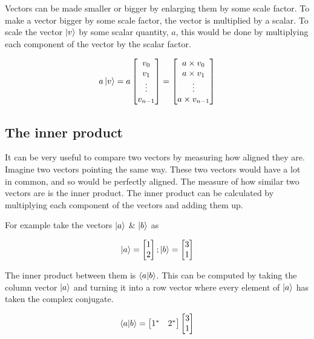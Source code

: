 Vectors can be made smaller or bigger by enlarging them by some scale factor. To make a vector bigger by some scale factor, the vector is multiplied by a scalar. To scale the vector $\ket{v}$ by some scalar quantity, $a$, this would be done by multiplying each component of the vector by the scalar factor. 

$$ a \ket{v} = a\begin{bmatrix} v_0 \\ v_1 \\ \vdots \\ v_{n-1} \end{bmatrix} = \begin{bmatrix} a \times v_0 \\ a \times v_1 \\ \vdots \\ a \times v_{n-1} \end{bmatrix} $$

\subsection{The inner product}

It can be very useful to compare two vectors by measuring how aligned they are. Imagine two vectors pointing the same way. These two vectors would have a lot in common, and so would be perfectly aligned. The measure of how similar two vectors are is the inner product. The inner product can be calculated by multiplying each component of the vectors and adding them up. 

For example take the vectors $\ket{a}$ \& $\ket{b}$ as 

 $$
 \ket{a} = \begin{bmatrix} 1 \\ 2 \end{bmatrix} ;  \ket{b} = \begin{bmatrix} 3 \\ 1 \end{bmatrix} 
 $$

 The inner product between them is $\braket{a|b}$. This can be computed by taking the column vector $\ket{a}$ and turning it into a row vector where every element of $\ket{a}$ has taken the complex conjugate. 

 $$
\braket{a|b} = \begin{bmatrix} 1^* & 2^* \end{bmatrix}  \begin{bmatrix} 3 \\ 1 \end{bmatrix}
 $$

